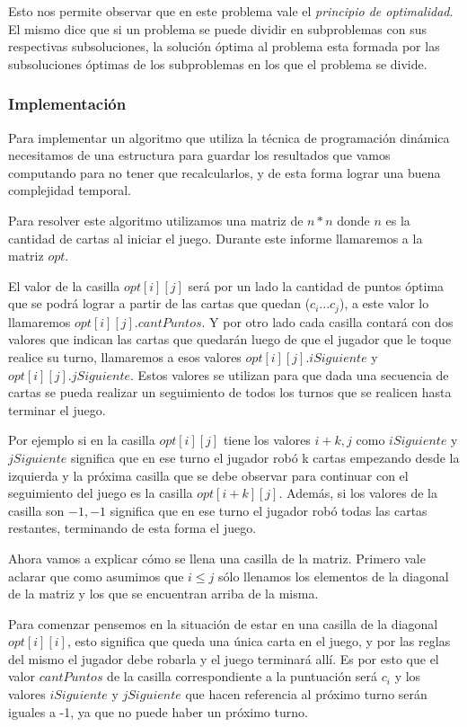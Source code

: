 Esto nos permite observar que en este problema vale el \emph{principio de optimalidad}. El mismo dice que si un problema se puede dividir en subproblemas con sus respectivas subsoluciones, la solución óptima al problema esta formada por las subsoluciones óptimas de los subproblemas en los que el problema se divide.

\subsubsection{Implementación}

Para implementar un algoritmo que utiliza la técnica de programación dinámica necesitamos de una estructura para guardar los resultados que vamos computando para no tener que recalcularlos, y de esta forma lograr una buena complejidad temporal.

Para resolver este algoritmo utilizamos una matriz de $n * n$ donde $n$ es la cantidad de cartas al iniciar el juego. Durante este informe llamaremos a la matriz $opt$.

El valor de la casilla $opt[i][j]$ será por un lado la cantidad de puntos óptima que se podrá lograr a partir de las cartas que quedan ($c_i ... c_j$), a este valor lo llamaremos $opt[i][j].cantPuntos$. Y por otro lado cada casilla contará con dos valores que indican las cartas que quedarán luego de que el jugador que le toque realice su turno, llamaremos a esos valores $opt[i][j].iSiguiente$ y $opt[i][j].jSiguiente$. Estos valores se utilizan para que dada una secuencia de cartas se pueda realizar un seguimiento de todos los turnos que se realicen hasta terminar el juego.

Por ejemplo si en la casilla $opt[i][j]$ tiene los valores $i+k, j$ como $iSiguiente$ y $jSiguiente$ significa que en ese turno el jugador robó k cartas empezando desde la izquierda y la próxima casilla que se debe observar para continuar con el seguimiento del juego es la casilla $opt[i+k][j]$. Además, si los valores de la casilla son $-1, -1$ significa que en ese turno el jugador robó todas las cartas restantes, terminando de esta forma el juego.

Ahora vamos a explicar cómo se llena una casilla de la matriz. Primero vale aclarar que como asumimos que $i \leq j$ sólo llenamos los elementos de la diagonal de la matriz y los que se encuentran arriba de la misma.

Para comenzar pensemos en la situación de estar en una casilla de la diagonal $opt[i][i]$, esto significa que queda una única carta en el juego, y por las reglas del mismo el jugador debe robarla y el juego terminará allí. Es por esto que el valor $cantPuntos$ de la casilla correspondiente a la puntuación será $c_i$ y los valores $iSiguiente$ y $jSiguiente$ que hacen referencia al próximo turno serán iguales a -1, ya que no puede haber un próximo turno.

